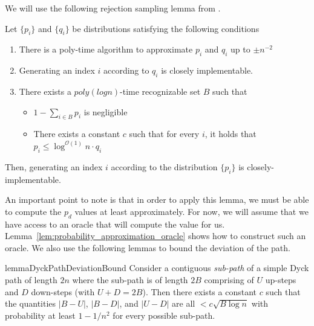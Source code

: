 We will use the following rejection sampling lemma from \cite{huge}.
\begin{lemma}
\label{lem:huge}
Let $\{p_i\}$ and $\{q_i\}$ be distributions satisfying the following conditions
\begin{enumerate}
    \item There is a poly-time algorithm to approximate $p_i$ and $q_i$ up to $\pm n^{-2}$
    \item Generating an index $i$ according to $q_i$ is closely implementable.
    \item There exists a $poly(log n)$-time recognizable set $B$ such that
    \begin{itemize}
        \item $1-\sum\limits_{i\in B} p_i$ is negligible
        \item There exists a constant $c$ such that for every $i$, it holds that $p_i\le \log^{\mathcal{O}(1)} n\cdot q_i$
    \end{itemize}
\end{enumerate}
Then, generating an index $i$ according to the distribution $\{p_i\}$ is closely-implementable.
\end{lemma}
An important point to note is that in order to apply this lemma, we must be able to compute the $p_d$ values at least approximately.
For now, we will assume that we have access to an oracle that will compute the value for us.
Lemma~\ref{lem:probability_approximation_oracle} shows how to construct such an oracle.
We also use the following lemmas to bound the deviation of the path.
\begin{restatable}{lemma}{DyckPathDeviationBound}
\label{lem:DyckPathDeviationBound}
Consider a contiguous \emph{sub-path} of a simple Dyck path of length $2n$
where the sub-path is of length $2B$ comprising of $U$ up-steps and $D$ down-steps (with $U + D = 2B$).
Then there exists a constant $c$ such that the quantities $|B-U|$, $|B-D|$, and $|U-D|$
are all $<c\sqrt{B\log n}$ with probability at least $1-1/n^2$ for every possible sub-path.
\end{restatable}



